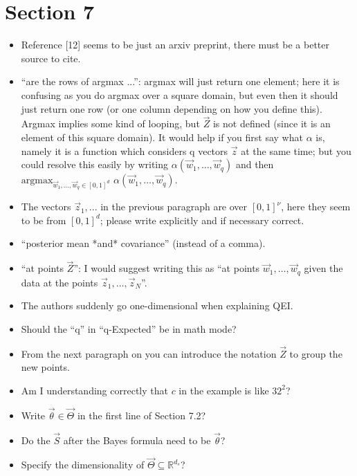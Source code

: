 \documentclass{article}[12pt]
\newcommand{\Referee}[1]{{\color{blue} #1}}
\begin{document}
\section{Section 7}

\begin{itemize}
    \item \Referee{Reference [12] seems to be just an arxiv preprint, there must be a better source to cite.}
    \item \Referee{``are the rows of argmax ...'': argmax will just return one element; here it is confusing as you do argmax over a square domain, but even then it should just return one row (or one column depending on how you define this). Argmax implies some kind of looping, but $\vec{Z}$ is not defined (since it is an element of this square domain). It would help if you first say what $\alpha$ is, namely it is a function which considers q vectors $\vec{z}$ at the same time; but you could resolve this easily by writing $\alpha(\vec{w}_1, \ldots,\vec{w}_q)$ and then $\mathrm{argmax}_{\vec{w}_1,\ldots,\vec{w}_q \in [0, 1]^d}$ $\alpha(\vec{w}_1, \ldots, \vec{w}_q)$.}
    \item \Referee{The vectors $\vec{z}_1, ...$ in the previous paragraph are over $[0, 1]^\nu$, here they seem to be from $[0, 1]^d$; please write explicitly and if necessary correct.}
    \item \Referee{``posterior mean *and* covariance'' (instead of a comma).}
    \item \Referee{``at points $\vec{Z}$'': I would suggest writing this as ``at points $\vec{w}_1,\ldots,\vec{w}_q$ given the data at the points $\vec{z}_1,\ldots,\vec{z}_N$''.}
    \item \Referee{The authors suddenly go one-dimensional when explaining QEI.}
    \item \Referee{Should the ``q'' in ``q-Expected'' be in math mode?}
    \item \Referee{From the next paragraph on you can introduce the notation $\vec{Z}$ to group the new points.}
    \item \Referee{Am I understanding correctly that $c$ in the example is like $32^2$?}
    \item \Referee{Write $\vec{\theta} \in \vec{\Theta}$ in the first line of Section 7.2?}
    \item \Referee{Do the $\vec{S}$ after the Bayes formula need to be $\vec{\theta}$?}
    \item \Referee{Specify the dimensionality of $\vec{\Theta} \subseteq \mathbb{R}^{d_s}$?}

\end{itemize}
\end{document}
